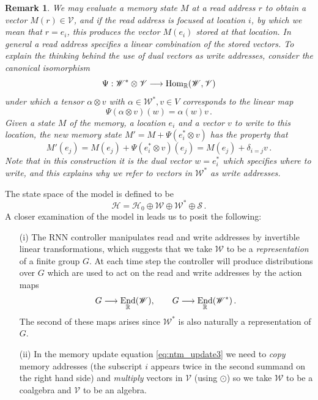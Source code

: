\documentclass[english,letter paper,12pt,leqno]{article}
\theoremstyle{example}
\newtheorem{remark}[theorem]{Remark}
\numberwithin{equation}{section}
\def\Hom{\operatorname{Hom}}
\def\be{\begin{equation}}
\def\ee{\end{equation}}
\DeclareMathOperator{\End}{End}
\begin{document}
\begin{remark} We may evaluate a memory state $M$ at a read address $r$ to obtain a vector $M(r) \in \mathscr{V}$, and if the read address is \emph{focused} at location $i$, by which we mean that $r = e_i$, this produces the vector $M(e_i)$ stored at that location. In general a read address specifies a linear combination of the stored vectors. To explain the thinking behind the use of dual vectors as write addresses, consider the canonical isomorphism
\be\label{defn:psimap}
\Psi: \mathscr{W}^* \otimes \mathscr{V} \lto \Hom_{\mathbb{R}}(\mathscr{W},\mathscr{V})
\ee
under which a tensor $\alpha \otimes v$ with $\alpha \in \mathscr{W}^*, v \in V$ corresponds to the linear map
\[
\Psi( \alpha \otimes v )(w) = \alpha(w) v\,.
\]
Given a state $M$ of the memory, a location $e_i$ and a vector $v$ to write to this location, the new memory state $M' = M + \Psi( e_i^* \otimes v )$ has the property that
\[
M'(e_j) = M(e_j) + \Psi( e_i^* \otimes v )(e_j) = M(e_j) + \delta_{i=j} v\,.
\]
Note that in this construction it is the dual vector $w = e_i^*$ which specifies \emph{where to write}, and this explains why we refer to vectors in $\mathscr{W}^*$ as write addresses. 
\end{remark}

The state space of the model is defined to be
\[
\mathscr{H} = \mathscr{H}_0 \oplus \mathscr{W} \oplus \mathscr{W}^* \oplus \mathscr{S}\,.
\]
A closer examination of the model in \cite{ntm} leads us to posit the following:

\begin{itemize}
\item[(i)] The RNN controller manipulates read and write addresses by invertible linear transformations, which suggests that we take $\mathscr{W}$ to be a \emph{representation} of a finite group $G$. At each time step the controller will produce distributions over $G$ which are used to act on the read and write addresses by the action maps
\[
G \lto \End_{\mathbb{R}}(\mathscr{W}), \qquad G \lto \End_{\mathbb{R}}(\mathscr{W}^*)\,.
\]
The second of these maps arises since $\mathscr{W}^*$ is also naturally a representation of $G$.
\item[(ii)] In the memory update equation \eqref{eq:ntm_update3} we need to \emph{copy} memory addresses (the subscript $i$ appears twice in the second summand on the right hand side) and \emph{multiply} vectors in $\mathscr{V}$ (using $\odot$) so we take $\mathscr{W}$ to be a coalgebra and $\mathscr{V}$ to be an algebra. %
\end{itemize}
\end{document}
